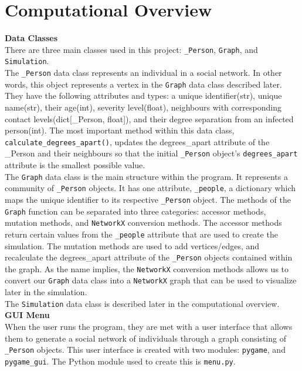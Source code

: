 \documentclass[fontsize=11pt]{article}
\newcommand{\ttt}[1]{\texttt{#1}}
\begin{document}
    \section*{Computational Overview}
    \textbf{Data Classes}\\
    There are three main classes used in this project: \ttt{\_Person}, \ttt{Graph}, and \ttt{Simulation}.\\
    \newline
    The \ttt{\_Person} data class represents an individual in a social network. In other words, this object represents a vertex in the \ttt{Graph} data class described later. They have the following attributes and types: a unique identifier(str), unique name(str), their age(int), severity level(float), neighbours with corresponding contact levels(dict[\_Person, float]), and their degree separation from an infected person(int). The most important method within this data class, \ttt{calculate\_degrees\_apart()}, updates the degrees\_apart attribute of the \_Person and their neighbours so that the initial \ttt{\_Person} object's \ttt{degrees\_apart} attribute is the smallest possible value. \\
    \newline
    \noindent
    The \ttt{Graph} data class is the main structure within the program. It represents a community of \ttt{\_Person} objects. It has one attribute, \ttt{\_people}, a dictionary which maps the unique identifier to its respective \ttt{\_Person} object. The methods of the \ttt{Graph} function can be separated into three categories: accessor methods, mutation methods, and \ttt{NetworkX} conversion methods. The accessor methods return certain values from the \ttt{\_people} attribute that are used to create the simulation. The mutation methods are used to add vertices/edges, and recalculate the degrees\_apart attribute of the \ttt{\_Person} objects contained within the graph. As the name implies, the \ttt{NetworkX} conversion methods allows us to convert our \ttt{Graph} data class into a \ttt{NetworkX} graph that can be used to visualize later in the simulation.\\
    \newline
    \noindent
    The \ttt{Simulation} data class is described later in the computational overview.\\
    \newline
    \noindent
    \textbf{GUI Menu}\\
    When the user runs the program, they are met with a user interface that allows them to generate a social network of individuals through a graph consisting of \ttt{\_Person} objects. This user interface is created with two modules: \ttt{pygame}, and \ttt{pygame\_gui}. The Python module used to create this is \ttt{menu.py}.\\
\end{document}
